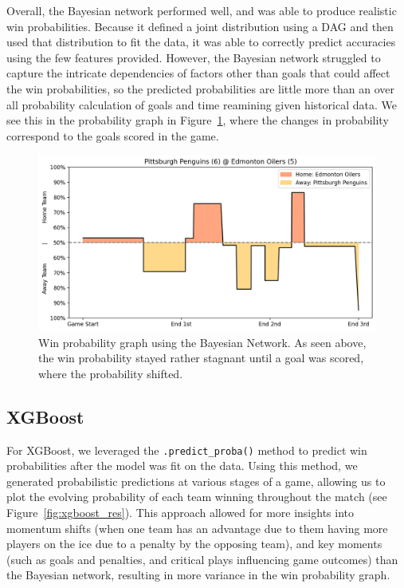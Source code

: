 \documentclass[11pt]{article}
\begin{document}
Overall, the Bayesian network performed well, and was able to produce realistic win probabilities. Because it defined a joint distribution using a DAG and
then used that distribution to fit the data, it was able to correctly predict accuracies using the few features provided. However, the Bayesian network struggled to capture the intricate dependencies
of factors other than goals that could affect the win probabilities, so the predicted probabilities are little more than an over all probability calculation of goals and time reamining given historical data.
We see this in the probability graph in Figure~\ref{fig:bayesian_graph}, where the changes in probability correspond to the goals scored in the game. 

\begin{figure}
    \centering
    \includegraphics[width=\textwidth]{images/good_bayesian_example.png}
    \caption{Win probability graph using the Bayesian Network. As seen above, the win probability stayed rather stagnant until a goal was scored, where the probability shifted.}
    \label{fig:bayesian_graph}
\end{figure}

\subsection{XGBoost}

For XGBoost, we leveraged the {\tt .predict\_proba()} method to predict win probabilities after the model was fit on the data.
Using this method, we generated 
probabilistic predictions at various stages of a game, allowing us to 
plot the evolving probability of each team winning throughout the match
(see Figure~\ref{fig:xgboost_res}). 
This approach allowed for more insights into momentum shifts (when one team 
has an advantage due to them having more players on the ice due to 
a penalty by the opposing team), and key moments (such as goals and 
penalties, and critical plays influencing game outcomes) than the Bayesian network, resulting in more variance in the win probability graph.
\end{document}
